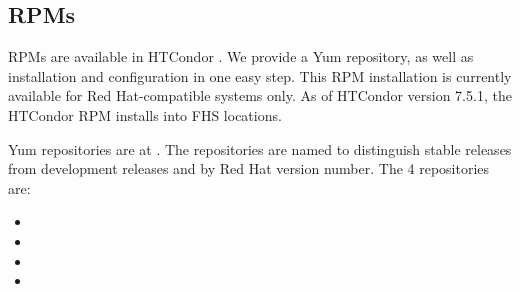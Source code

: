 

\subsection{\label{sec:install-rpms} RPMs}

RPMs are available in HTCondor \VersionNotice.
We provide a Yum repository, as well as 
installation and configuration in one easy step.
This RPM installation is currently available for Red Hat-compatible
systems only.
As of HTCondor version 7.5.1, 
the HTCondor RPM installs into FHS locations.

Yum repositories are at
  .
The repositories are named to distinguish stable releases from
development releases and by Red Hat version number. 
The 4 repositories are:
\begin{itemize}
  \item {}
  \item {}
  \item {}
  \item {}
\end{itemize}

